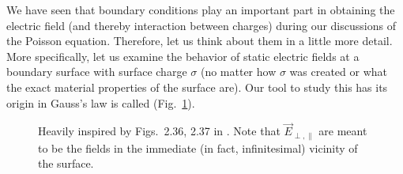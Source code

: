 \documentclass[../class_mech_main.tex]{subfiles}
\begin{document}
We have seen that boundary conditions play an important part in obtaining the electric field (and thereby interaction between charges) during our discussions of the Poisson equation. Therefore, let us think about them in a little more detail. More specifically, let us examine the behavior of static electric fields at a boundary surface with surface charge $\sigma$ (no matter how $\sigma$ was created or what the exact material properties of the surface are). Our tool to study this has its origin in Gauss's law is called  (Fig.~\ref{fig:gaussian_pillow}).



\begin{figure}
    \centering

    \hspace*{0.1\textwidth}%

    \caption{Heavily inspired by Figs.~2.36, 2.37 in \cite{Griffiths_2017}. Note that $\vec{E}_{\perp, \parallel}$ are meant to be the fields in the immediate (in fact, infinitesimal) vicinity of the surface.}
    \label{fig:gaussian_pillow}
\end{figure}
\end{document}
